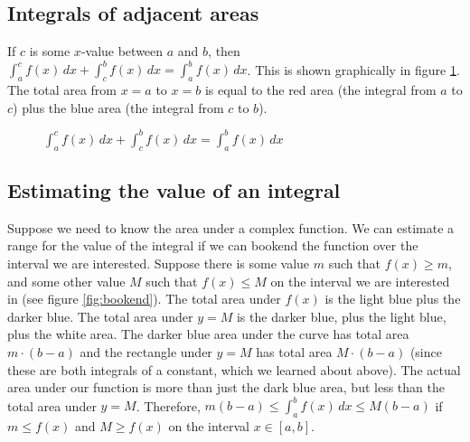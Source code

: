 \subsection{Integrals of adjacent areas}
If $c$ is some $x$-value between $a$ and $b$, then $\int_a^c f(x)\,dx 
+ \int_c^b f(x)\,dx = \int_a^b f(x)\,dx$. This is shown graphically in 
figure \ref{fig:adjacent}. The total area from $x=a$ to $x=b$ is equal 
to the red area (the integral from $a$ to $c$) plus the blue area (the 
integral from $c$ to $b$). 

\begin{figure}[H]
	\centering
	\caption{$\int_a^c f(x)\,dx + \int_c^b f(x)\,dx = \int_a^b f(x)\,dx$}
	\label{fig:adjacent}
\end{figure}

\subsection{Estimating the value of an integral}
Suppose we need to know the area under a complex function. We can 
estimate a range for the value of the integral if we can bookend the 
function over the interval we are interested. Suppose there is some 
value $m$ such that $f(x) \geq m$, and some other value $M$ such that 
$f(x) \leq M$ on the interval we are interested in (see figure 
\ref{fig:bookend}). The total area under $f(x)$ is the light blue 
plus the darker blue. The total area under $y=M$ is the darker blue, 
plus the light blue, plus the white area. The darker blue area under 
the curve has total area $m \cdot (b - a)$ and the rectangle under 
$y=M$ has total area $M \cdot (b - a)$ (since these are both integrals 
of a constant, which we learned about above). The actual area under our 
function is more than just the dark blue area, but less than the total 
area under $y=M$. Therefore, $m(b - a) \leq \int_a^b f(x)\,dx \leq 
M(b -a)$ if $m \leq f(x)$ and $M \geq f(x)$ on the interval $x \in 
[a, b]$. 

